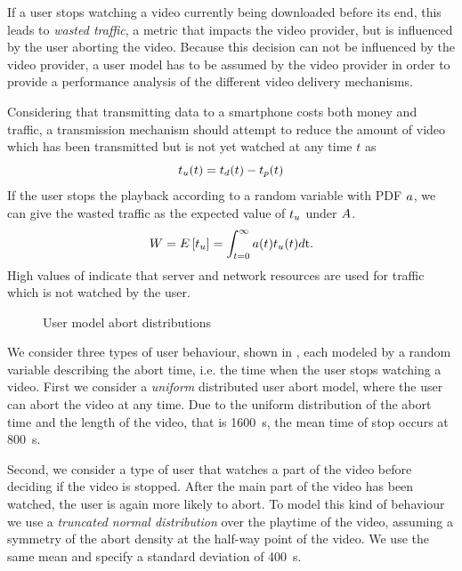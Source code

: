 If a user stops watching a video currently being downloaded before its end, this leads to \emph{wasted traffic}, a metric that impacts the video provider, but is influenced by the user aborting the video.
Because this decision can not be influenced by the video provider, a user model has to be assumed by the video provider in order to provide a performance analysis of the different video delivery mechanisms.

Considering that transmitting data to a smartphone costs both money and traffic, a transmission mechanism should attempt to reduce the amount of video which has been transmitted but is not yet watched at any time \(t\) as 
\[t_u(t) = t_d(t) - t_p(t)\]
If the user stops the playback according to a random variable \userabortrv with \gls{PDF} \(a\), we can give the wasted traffic \meanwastedtraffic as the expected value of $t_u$ under $A$.
\begin{equation}
W = E\left[t_u\right] = \int_{t=0}^{\infty} a(t) t_u(t) d\mathrm{t}.
\end{equation}
High values of \meanwastedtraffic indicate that server and network resources are used for traffic which is not watched by the user.

\begin{figure}
\begin{center}
  
  \caption{User model abort distributions}
  \label{fig:application:lte_video:system_model:model_assumptions:metrics:abort_distributions}
\end{center}
\end{figure}

We consider three types of user behaviour, shown in , each modeled by a random variable describing the abort time, i.e. the time when the user stops watching a video.
First we consider a \emph{uniform} distributed user abort model, where the user can abort the video at any time.
Due to the uniform distribution of the abort time and the length of the video, that is \SI{1600}{\second}, the mean time of stop occurs at \SI{800}{\second}.

Second, we consider a type of user that watches a part of the video before deciding if the video is stopped. 
After the main part of the video has been watched, the user is again more likely to abort.
To model this kind of behaviour we use a \emph{truncated normal distribution} over the playtime of the video, assuming a symmetry of the abort density at the half-way point of the video.
We use the same mean and specify a standard deviation of \SI{400}{\second}.

